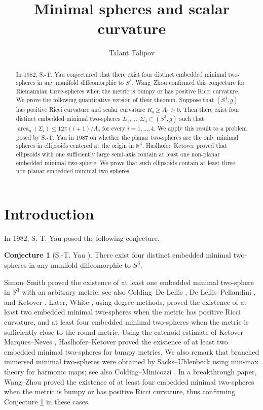 \documentclass[12pt,english]{amsart}
\title{Minimal spheres and scalar curvature}
\author{Talant Talipov}
\date{}
\theoremstyle{definition}
\newtheorem{conjecture}[theorem]{Conjecture}
\begin{document}
\begin{abstract}
    In 1982, S.-T. Yau conjectured that there exist four distinct embedded minimal two-spheres in any manifold diffeomorphic to \(S^3\). Wang--Zhou confirmed this conjecture for Riemannian three-spheres when the metric is bumpy or has positive Ricci curvature. We prove the following quantitative version of their theorem. Suppose that \((S^3,g)\) has positive Ricci curvature and scalar curvature \(R_g\ge \Lambda_0>0\). Then there exist four distinct embedded minimal two-spheres \(\Sigma_1,\ldots,\Sigma_4\subset (S^3,g)\) such that \(\operatorname{area}_{g}(\Sigma_i)\le 12\pi(i+1)/\Lambda_0\) for every \(i=1,\ldots,4\). We apply this result to a problem posed by S.-T. Yau in 1987 on whether the planar two-spheres are the only minimal spheres in ellipsoids centered at the origin in \(\mathbb R^4\). Haslhofer--Ketover proved that ellipsoids with one sufficiently large semi-axis contain at least one non-planar embedded minimal two-sphere. We prove that such ellipsoids contain at least three non-planar embedded minimal two-spheres.
\end{abstract}

\maketitle

\section{Introduction}

In 1982, S.-T. Yau posed the following conjecture.

\begin{conjecture}[{S.-T. Yau \cite[Problem~89]{Y}}]
\label{conj:yau}
    There exist four distinct embedded minimal two-spheres in any manifold diffeomorphic to \(S^3\).
\end{conjecture}

Simon--Smith \cite{SS} proved the existence of at least one embedded minimal two-sphere in \(S^3\) with an arbitrary metric; see also Colding--De Lellis \cite{CD}, De Lellis--Pellandini \cite{DP}, and Ketover \cite{K}. Later, White \cite{W1}, using degree methods, proved the existence of at least two embedded minimal two-spheres when the metric has positive Ricci curvature, and at least four embedded minimal two-spheres when the metric is sufficiently close to the round metric. Using the catenoid estimate of Ketover--Marques--Neves \cite{KMN}, Haslhofer--Ketover \cite{HK} proved the existence of at least two embedded minimal two-spheres for bumpy metrics. We also remark that branched immersed minimal two-spheres were obtained by Sacks--Uhlenbeck \cite{SU} using min-max theory for harmonic maps; see also Colding--Minicozzi \cite{CM}. In a breakthrough paper, Wang--Zhou \cite{WZ} proved the existence of at least four embedded minimal two-spheres when the metric is bumpy or has positive Ricci curvature, thus confirming Conjecture \ref{conj:yau} in these cases.
\end{document}
